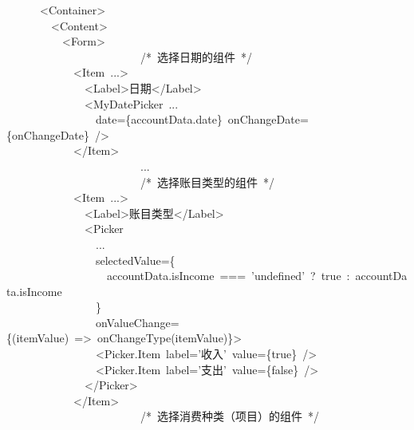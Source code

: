 \documentclass{article}
\begin{document}
\begin{mdpre}%
\noindent~~~~~~\textless{}Container\textgreater{}\\
~~~~~~~~\textless{}Content\textgreater{}\\
~~~~~~~~~~\textless{}Form\textgreater{}\\
~~~~~~~~~~~~~~~~~~~~~~~~{/*}{~选择日期的组件~}{*/}\\
~~~~~~~~~~~~\textless{}Item~...\textgreater{}\\
~~~~~~~~~~~~~~\textless{}Label\textgreater{}日期\textless{}/Label\textgreater{}\\
~~~~~~~~~~~~~~\textless{}MyDatePicker~...\\
~~~~~~~~~~~~~~~~date=\{accountData.date\}~onChangeDate=\{onChangeDate\}~/\textgreater{}\\
~~~~~~~~~~~~\textless{}/Item\textgreater{}\\
~~~~~~~~~~~~~~~~~~~~~~~~...\\
~~~~~~~~~~~~~~~~~~~~~~~~{/*}{~选择账目类型的组件~}{*/}\\
~~~~~~~~~~~~\textless{}Item~...\textgreater{}\\
~~~~~~~~~~~~~~\textless{}Label\textgreater{}账目类型\textless{}/Label\textgreater{}\\
~~~~~~~~~~~~~~\textless{}Picker\\
~~~~~~~~~~~~~~~~...\\
~~~~~~~~~~~~~~~~selectedValue=\{\\
~~~~~~~~~~~~~~~~~~accountData.isIncome~===~{'}{undefined}{'}~?~{true}~:~accountData.isIncome\\
~~~~~~~~~~~~~~~~\}\\
~~~~~~~~~~~~~~~~onValueChange=\{(itemValue)~=\textgreater{}~onChangeType(itemValue)\}\textgreater{}\\
~~~~~~~~~~~~~~~~\textless{}Picker.Item~label={'}{收入}{'}~value=\{{true}\}~/\textgreater{}\\
~~~~~~~~~~~~~~~~\textless{}Picker.Item~label={'}{支出}{'}~value=\{{false}\}~/\textgreater{}\\
~~~~~~~~~~~~~~\textless{}/Picker\textgreater{}\\
~~~~~~~~~~~~\textless{}/Item\textgreater{}\\
~~~~~~~~~~~~~~~~~~~~~~~~{/*}{~选择消费种类（项目）的组件~}{*/}\\

\end{mdpre}
\end{document}
